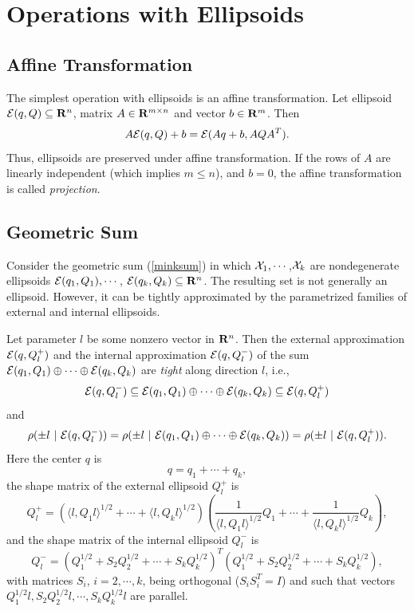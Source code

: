 \documentclass{report}
\newcommand{\EE}{{\cal E}}
\newcommand{\XX}{{\cal X}}
\begin{document}
\section{Operations with Ellipsoids}
\subsection{Affine Transformation}
The simplest operation with ellipsoids is an affine transformation.
Let ellipsoid $\EE(q,Q)\subseteq{\bf R}^n$, matrix $A\in{\bf R}^{m\times n}$
and vector $b\in{\bf R}^m$. Then
\begin{equation}
A\EE(q,Q) + b = \EE(Aq+b, AQA^T) .\label{affinetrans}
\end{equation}
Thus, ellipsoids are preserved under affine transformation.
If the rows of $A$ are linearly independent (which implies  $m\leq n$), and
$b=0$, the affine transformation is called {\it projection}.


\subsection{Geometric Sum}
Consider the geometric sum (\ref{minksum}) in which $\XX_1,\cdots$,$\XX_k$
are  nondegenerate ellipsoids
$\EE(q_1,Q_1),\cdots$, $\EE(q_k,Q_k)\subseteq{\bf R}^n$.
The resulting set is not generally  an ellipsoid.
However, it can be tightly approximated by the parametrized families
of external and internal ellipsoids.

Let parameter $l$ be some nonzero vector in ${\bf R}^n$. Then the external
approximation $\EE(q,Q_l^+)$ and the internal approximation $\EE(q,Q_l^-)$
of the sum $\EE(q_1,Q_1)\oplus\cdots\oplus\EE(q_k,Q_k)$ are \emph{tight} along
direction $l$, i.e.,
\[ \EE(q,Q_l^-)\subseteq\EE(q_1,Q_1)\oplus\cdots\oplus\EE(q_k,Q_k)
\subseteq\EE(q,Q_l^+) \]
and
\[ \rho(\pm l ~|~ \EE(q,Q_l^-)) =
\rho(\pm l ~|~ \EE(q_1,Q_1)\oplus\cdots\oplus\EE(q_k,Q_k)) =
\rho(\pm l ~|~ \EE(q,Q_l^+)).\]
Here the center $q$ is
\begin{equation}
q = q_1 + \cdots + q_k , \label{minksum_c}
\end{equation}
the shape matrix of the external ellipsoid $Q_l^+$ is
\begin{equation}
Q_l^+ = \left(\langle l,Q_1l\rangle^{1/2} + \cdots
+ \langle l,Q_kl\rangle^{1/2}\right)
\left(\frac{1}{\langle l,Q_1l\rangle^{1/2}}Q_1 + \cdots +
\frac{1}{\langle l,Q_kl\rangle^{1/2}}Q_k\right), \label{minksum_ea}
\end{equation}
and the shape matrix of the internal ellipsoid $Q_l^-$ is
\begin{equation}
Q_l^- = \left(Q_1^{1/2} + S_2Q_2^{1/2} + \cdots + S_kQ_k^{1/2}\right)^T
\left(Q_1^{1/2} + S_2Q_2^{1/2} + \cdots + S_kQ_k^{1/2}\right),\label{minksum_ia}
\end{equation}
with matrices $S_i$, $i=2,\cdots,k$, being orthogonal ($S_iS_i^T=I$) and such
that vectors $Q_1^{1/2}l, S_2Q_2^{1/2}l, \cdots, S_kQ_k^{1/2}l$ are parallel.
\end{document}
